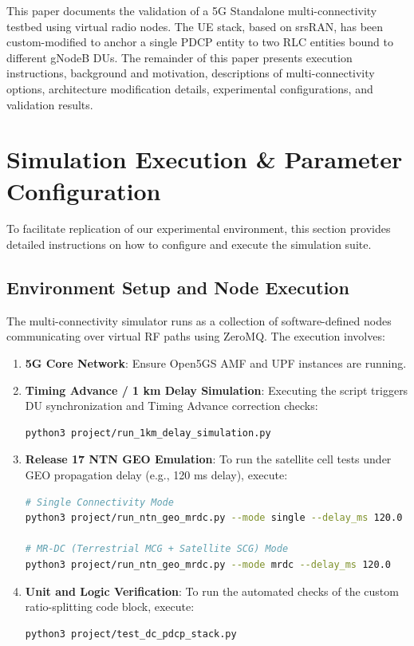 \documentclass[conference]{IEEEtran}
\begin{document}
This paper documents the validation of a 5G Standalone multi-connectivity testbed using virtual radio nodes. The UE stack, based on srsRAN, has been custom-modified to anchor a single PDCP entity to two RLC entities bound to different gNodeB DUs. The remainder of this paper presents execution instructions, background and motivation, descriptions of multi-connectivity options, architecture modification details, experimental configurations, and validation results.

\section{Simulation Execution \& Parameter Configuration}
To facilitate replication of our experimental environment, this section provides detailed instructions on how to configure and execute the simulation suite.

\subsection{Environment Setup and Node Execution}
The multi-connectivity simulator runs as a collection of software-defined nodes communicating over virtual RF paths using ZeroMQ. The execution involves:
\begin{enumerate}
    \item \textbf{5G Core Network}: Ensure Open5GS AMF and UPF instances are running.
    \item \textbf{Timing Advance / 1 km Delay Simulation}: Executing the script triggers DU synchronization and Timing Advance correction checks:
    \begin{lstlisting}[language=bash]
python3 project/run_1km_delay_simulation.py
    \end{lstlisting}
    \item \textbf{Release 17 NTN GEO Emulation}: To run the satellite cell tests under GEO propagation delay (e.g., 120 ms delay), execute:
    \begin{lstlisting}[language=bash]
# Single Connectivity Mode
python3 project/run_ntn_geo_mrdc.py --mode single --delay_ms 120.0

# MR-DC (Terrestrial MCG + Satellite SCG) Mode
python3 project/run_ntn_geo_mrdc.py --mode mrdc --delay_ms 120.0
    \end{lstlisting}
    \item \textbf{Unit and Logic Verification}: To run the automated checks of the custom ratio-splitting code block, execute:
    \begin{lstlisting}[language=bash]
python3 project/test_dc_pdcp_stack.py
    \end{lstlisting}
\end{enumerate}
\end{document}
